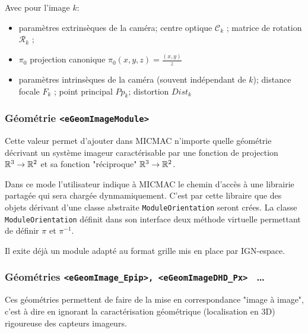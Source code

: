 Avec pour l'image $k$:

\begin{itemize}
   \item   param\`etres extrins\`eques de la cam\'era;
           centre optique $\mathcal{C}_k$ ; matrice de rotation $\mathcal{R}_k$ ;
   \item   $\pi_0$ projection canonique $\pi_0(x,y,z)=\frac{(x,y)}{z}$
   \item   param\`etres intrins\`eques de la cam\'era (souvent ind\'ependant de $k$);
           distance focale $F_k$ ; point principal $Pp_k$; distortion $Dist_k$
     
\end{itemize}

    


\subsubsection{G\'eom\'etrie {\tt   <eGeomImageModule>}}

\label{DU:Meca:Geo:Mod}

 Cette  valeur permet  d'ajouter dans MICMAC n'importe quelle g\'eom\'etrie
d\'ecrivant un syst\`eme imageur caract\'erisable par une fonction de
projection $\RR^3 \rightarrow \RR^2$ et sa fonction "r\'eciproque"
$\RR^3 \rightarrow \RR^2$. 

    Dans ce mode l'utilisateur indique \`a MICMAC le chemin d'acc\`es 
\`a une librairie partag\'ee qui sera charg\'ee dynmamiquement. C'est par cette
libraire que des objets d\'erivant d'une classe abstraite
 {\tt ModuleOrientation} seront cr\'ees. La classe {\tt ModuleOrientation}
d\'efinit dans son interface deux m\'ethode virtuelle permettant de
d\'efinir $\pi$ et $\pi^{-1}$.

   Il exite d\'ej\`a un module adapt\'e au format grille mis en place
par IGN-espace.



\subsubsection{G\'eom\'etries  {\tt <eGeomImage\_Epip>, <eGeomImageDHD\_Px> } \dots }

\label{DuMeca:Geom:Epip}

Ces g\'eom\'etries  permettent de faire de la mise en correspondance
"image \`a image", c'est \`a dire en ignorant la caract\'erisation
g\'eom\'etrique (localisation en 3D) rigoureuse des capteurs imageurs.

